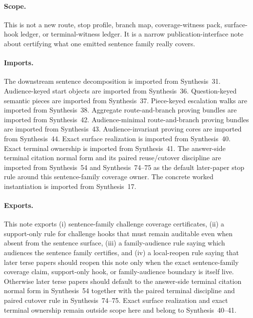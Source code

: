 \documentclass[11pt]{article}
\begin{document}
\paragraph{Scope.}
This is not a new route, stop profile, branch map, coverage-witness pack, surface-hook ledger, or terminal-witness ledger.
It is a narrow publication-interface note about certifying what one emitted sentence family really covers.

\paragraph{Imports.}
The downstream sentence decomposition is imported from Synthesis~31.\cite{series:downstreamnormalforms}
Audience-keyed start objects are imported from Synthesis~36.\cite{series:challengeroutes}
Question-keyed semantic pieces are imported from Synthesis~37.\cite{series:challengestops}
Piece-keyed escalation walks are imported from Synthesis~38.\cite{series:challengebranches}
Aggregate route-and-branch proving bundles are imported from Synthesis~42.\cite{series:challengecoveragewitnesspacks}
Audience-minimal route-and-branch proving bundles are imported from Synthesis~43.\cite{series:challengecoveragewitnessslices}
Audience-invariant proving cores are imported from Synthesis~44.\cite{series:challengecoveragewitnesscores}
Exact surface realization is imported from Synthesis~40.\cite{series:challengesurfacehooks}
Exact terminal ownership is imported from Synthesis~41.\cite{series:challengeterminalwitnesses}
The answer-side terminal citation normal form and its paired reuse/cutover discipline are imported from Synthesis~54 and Synthesis~74--75 as the default later-paper stop rule around this sentence-family coverage owner.\cite{series:challengeanswerreviewmenus,series:pairedterminalcitationdiscipline,series:pairedterminalcutoverrules}
The concrete worked instantiation is imported from Synthesis~17.\cite{series:workedexample}

\paragraph{Exports.}
This note exports (i) sentence-family challenge coverage certificates, (ii) a support-only rule for challenge hooks that must remain auditable even when absent from the sentence surface, (iii) a family-audience rule saying which audiences the sentence family certifies, and (iv) a local-reopen rule saying that later terse papers should reopen this note only when the exact sentence-family coverage claim, support-only hook, or family-audience boundary is itself live. Otherwise later terse papers should default to the answer-side terminal citation normal form in Synthesis~54 together with the paired terminal discipline and paired cutover rule in Synthesis~74--75. Exact surface realization and exact terminal ownership remain outside scope here and belong to Synthesis~40--41.\cite{series:challengesurfacehooks,series:challengeterminalwitnesses,series:challengeanswerreviewmenus,series:pairedterminalcitationdiscipline,series:pairedterminalcutoverrules}
\end{document}
